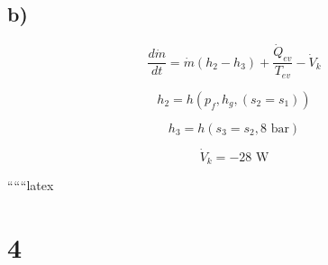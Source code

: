 

\subsection*{b)}

\[
\frac{d\dot{m}}{dt} = \dot{m} (h_2 - h_3) + \frac{\dot{Q}_{ev}}{T_{ev}} - \dot{V}_k
\]

\[
h_2 = h(p_f, h_g, (s_2 = s_1))
\]

\[
h_3 = h(s_3 = s_2, 8 \text{ bar})
\]

\[
\dot{V}_k = -28 \text{ W}
\]

``````latex

\section*{4}